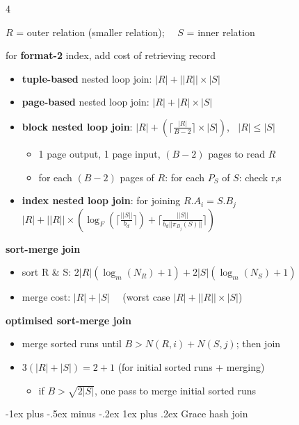 \documentclass{article}
\makeatletter
\renewcommand{\subsubsection}{\@startsection{subsubsection}{3}{0mm}%
    {-1ex plus -.5ex minus -.2ex}%
    {1ex plus .2ex}%
{\normalfont\bfseries}}%
\makeatother
\begin{document}
\begin{multicols*}{4}
\begin{scriptsize}
  $R$ = outer relation (smaller relation); $\quad S$ = inner relation

  \attention for \textbf{format-2} index, add cost of retrieving record

  \begin{itemize}
    \item \textbf{tuple-based} nested loop join: $|R| + ||R|| \times |S|$
    \item \textbf{page-based} nested loop join: $|R| + |R| \times |S|$
    \item \textbf{block nested loop join}: $|R| + ( \lceil \frac{|R|}{B-2} \rceil \times |S| )$, $\;\; |R|\leq|S|$
      \begin{itemize}
        \item 1 page output, 1 page input, $(B-2)$ pages to read $R$
        \item for each $(B-2)$ pages of $R$: for each $P_S$ of $S$: check r,s
      \end{itemize}
    \item \textbf{index nested loop join}: for joining $R.A_i = S.B_j$
      $|R| + ||R|| \times \left( \log_F(\lceil \frac{||S||}{b_d} \rceil ) + \lceil \frac{||S||}{b_d ||\pi_{B_j}(S)||} \rceil \right)$
  \end{itemize}

  \textbf{sort-merge join}

  \begin{itemize}
    \item sort R \& S: $2|R| (\log_m(N_R)+1) + 2|S| (\log_m(N_S)+1)$
    \item merge cost: $|R| + |S| \quad$ (worst case $|R| + ||R||\times|S|$)
  \end{itemize}

  \textbf{optimised sort-merge join}

  \begin{itemize}
    \item merge sorted runs until $B > N(R, i) + N(S, j)$; then join
    \item $3(|R|+|S|) = 2+1$ (for initial sorted runs + merging)
      \begin{itemize}
        \item if $B > \sqrt{2|S|}$, one pass to merge initial sorted runs
      \end{itemize}
  \end{itemize}

  \subsubsection{Grace hash join}


\end{scriptsize}
\end{multicols*}
\end{document}
